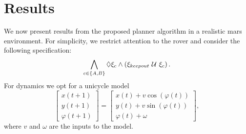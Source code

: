 \documentclass[conference]{IEEEtran}
\begin{document}
%
%
%

	

	\section{Results} \label{sec:simulation}

We now present results from the proposed planner algorithm in a realistic mars environment. For simplicity, we restrict attention to the rover and consider the following specification:
\begin{equation}
    \bigwedge_{c \in \{A,B \}} \lozenge \xi_c \land \left( \xi_{keepout} \ \mathcal{U}\  \xi_c \right).
\end{equation}
For dynamics we opt for a unicycle model
\begin{equation}
    \begin{bmatrix}
        x(t+1) \\
        y(t+1) \\
        \varphi(t+1)
    \end{bmatrix} = \begin{bmatrix}x(t) + v \cos(\varphi(t)) \\ y(t) + v \sin(\varphi(t)) \\ \varphi(t) + \omega \end{bmatrix},
\end{equation}
where $v$ and $\omega$ are the inputs to the model.
\end{document}
